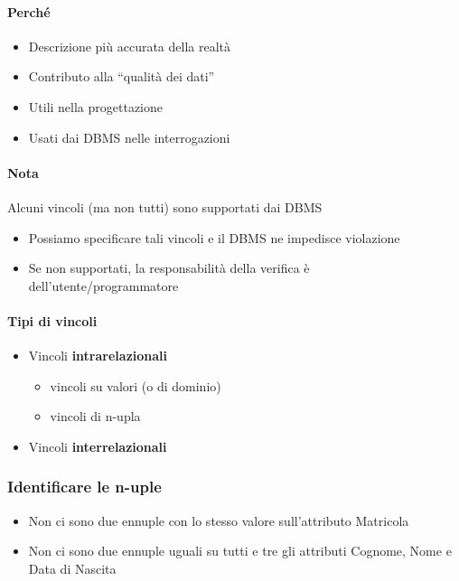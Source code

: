 \documentclass[12pt,a4paper]{article}
\begin{document}
\paragraph{Perché\\}
\begin{itemize}
\item Descrizione più accurata della realtà
\item Contributo alla “qualità dei dati”
\item Utili nella progettazione
\item Usati dai DBMS nelle interrogazioni
\end{itemize}

\paragraph{Nota\\}
Alcuni vincoli (ma non tutti) sono supportati dai DBMS
\begin{itemize}
\item Possiamo specificare tali vincoli e il DBMS ne impedisce violazione
\item Se non supportati, la responsabilità della verifica è dell’utente/programmatore
\end{itemize}

\paragraph{Tipi di vincoli\\}
\begin{itemize}
\item Vincoli \textbf{intrarelazionali}
\begin{itemize}
\item vincoli su valori (o di dominio)
\item vincoli di n-upla
\end{itemize}
\item Vincoli \textbf{interrelazionali}
\end{itemize}

\subsubsection{Identificare le n-uple}
\begin{itemize}
\item Non ci sono due ennuple con lo stesso valore sull’attributo Matricola
\item Non ci sono due ennuple uguali su tutti e tre gli attributi Cognome, Nome e Data di Nascita
\end{itemize}
\end{document}
